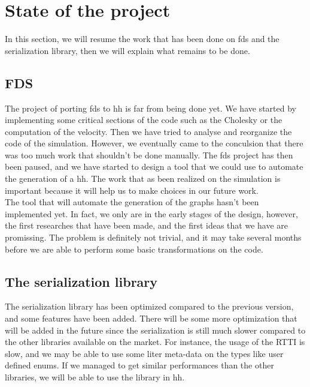 
\section{State of the project}

In this section, we will resume the work that has been done on \gls{fds} and the
serialization library, then we will explain what remains to be done.

\subsection{FDS}

The project of porting \gls{fds} to \gls{hh} is far from being done yet. We have
started by implementing some critical sections of the code such as the Cholesky
or the computation of the velocity. Then we have tried to analyse and reorganize
the code of the simulation. However, we eventually came to the conculsion that
there was too much work that shouldn't be done manually. The \gls{fds} project
has then been paused, and we have started to design a tool that we could use to
automate the generation of a \gls{hh}. The work that as been realized on the
simulation is important because it will help us to make choices in our future
work.\\

The tool that will automate the generation of the graphs hasn't been implemented
yet. In fact, we only are in the early stages of the design, however, the first
researches that have been made, and the first ideas that we have are promissing.
The problem is definitely not trivial, and it may take several months before we
are able to perform some basic transformations on the code.

\subsection{The serialization library}

The serialization library has been optimized compared to the previous version,
and some features have been added. There will be some more optimization that
will be added in the future since the serialization is still much slower
compared to the other libraries available on the market. For instance, the usage
of the RTTI is slow, and we may be able to use some liter meta-data on the types
like user defined enums. If we managed to get similar performances than the
other libraries, we will be able to use the library in \gls{hh}.
